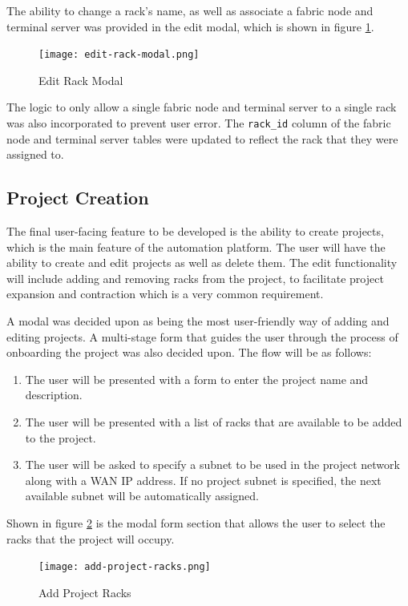The ability to change a rack's name, as well as associate a fabric node and terminal server was provided in the edit modal, which is shown in figure \ref{fig:edit-rack-modal}.

\begin{figure}[H]
    \centering
    \texttt{[image: edit-rack-modal.png]}
    \caption{Edit Rack Modal}
    \label{fig:edit-rack-modal}
\end{figure}

The logic to only allow a single fabric node and terminal server to a single rack was also incorporated to prevent user error. The \verb|rack_id| column of the fabric node and terminal server tables were updated to reflect the rack that they were assigned to.

\subsection{Project Creation}
The final user-facing feature to be developed is the ability to create projects, which is the main feature of the automation platform. The user will have the ability to create and edit projects as well as delete them. The edit functionality will include adding and removing racks from the project, to facilitate project expansion and contraction which is a very common requirement.

A modal was decided upon as being the most user-friendly way of adding and editing projects. A multi-stage form that guides the user through the process of onboarding the project was also decided upon. The flow will be as follows:
\begin{enumerate}
    \item The user will be presented with a form to enter the project name and description.
    \item The user will be presented with a list of racks that are available to be added to the project.
    \item The user will be asked to specify a subnet to be used in the project network along with a WAN IP address. If no project subnet is specified, the next available subnet will be automatically assigned.
\end{enumerate}
Shown in figure \ref{fig:add-project-racks} is the modal form section that allows the user to select the racks that the project will occupy.

\begin{figure}[H]
    \centering
    \texttt{[image: add-project-racks.png]}
    \caption{Add Project Racks}
    \label{fig:add-project-racks}
\end{figure}

